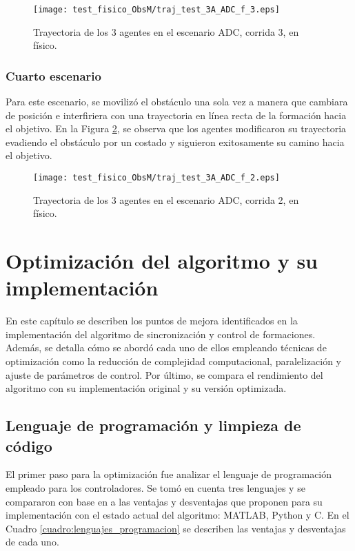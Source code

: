 \begin{figure}[H]
	\centering
	\texttt{[image: test\_fisico\_ObsM/traj\_test\_3A\_ADC\_f\_3.eps]}
	\caption{Trayectoria de los 3 agentes en el escenario ADC, corrida 3, en físico.}
	\label{fig:traj_test_3A_ADC_f_3}
\end{figure}

\subsection{Cuarto escenario}
Para este escenario, se movilizó el obstáculo una sola vez a manera que cambiara de posición e interfiriera con una trayectoria en línea recta de la formación hacia el objetivo. En la Figura \ref{fig:traj_test_3A_ADC_f_2}, se observa que los agentes modificaron su trayectoria evadiendo el obstáculo por un costado y siguieron exitosamente su camino hacia el objetivo.

\begin{figure}[H]
	\centering
	\texttt{[image: test\_fisico\_ObsM/traj\_test\_3A\_ADC\_f\_2.eps]}
	\caption{Trayectoria de los 3 agentes en el escenario ADC, corrida 2, en físico.}
	\label{fig:traj_test_3A_ADC_f_2}
\end{figure}


\chapter{Optimización del algoritmo y su implementación}\label{cap:optimizacion}
En este capítulo se describen los puntos de mejora identificados en la implementación del algoritmo de sincronización y control de formaciones. Además, se detalla cómo se abordó cada uno de ellos empleando técnicas de optimización como la reducción de complejidad computacional, paralelización y ajuste de parámetros de control. Por último, se compara el rendimiento del algoritmo con su implementación original y su versión optimizada.

\section{Lenguaje de programación y limpieza de código}
El primer paso para la optimización fue analizar el lenguaje de programación empleado para los controladores. Se tomó en cuenta tres lenguajes y se compararon con base en a las ventajas y desventajas que proponen para su implementación con el estado actual del algoritmo: MATLAB, Python y C. En el Cuadro \ref{cuadro:lenguajes_programacion} se describen las ventajas y desventajas de cada uno.

